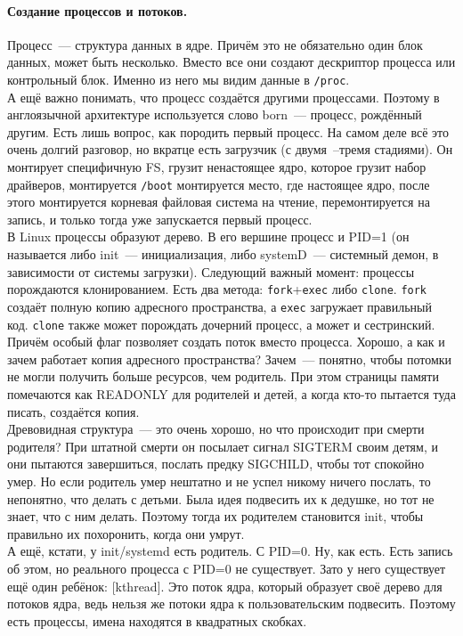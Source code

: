 \documentclass{article}
\begin{document}
    \paragraph{Создание процессов и потоков.}
    Процесс~--- структура данных в ядре. Причём это не обязательно один блок данных, может быть несколько. Вместо все они создают дескриптор процесса или контрольный блок. Именно из него мы видим данные в \texttt{/proc}.\\
    А ещё важно понимать, что процесс создаётся другими процессами. Поэтому в англоязычной архитектуре используется слово born~--- процесс, рождённый другим. Есть лишь вопрос, как породить первый процесс. На самом деле всё это очень долгий разговор, но вкратце есть загрузчик (с двумя~--тремя стадиями). Он монтирует специфичную FS, грузит ненастоящее ядро, которое грузит набор драйверов, монтируется \texttt{/boot} монтируется место, где настоящее ядро,  после этого монтируется корневая файловая система на чтение, перемонтируется на запись, и только тогда уже запускается первый процесс.\\
    В Linux процессы образуют дерево. В его вершине процесс и PID=1 (он называется либо init~--- инициализация, либо systemD~--- системный демон, в зависимости от системы загрузки). Следующий важный момент: процессы порождаются клонированием. Есть два метода: \texttt{fork}+\texttt{exec} либо \texttt{clone}. \texttt{fork} создаёт полную копию адресного пространства, а \texttt{exec} загружает правильный код. \texttt{clone} также может порождать дочерний процесс, а может и сестринский. Причём особый флаг позволяет создать поток вместо процесса. Хорошо, а как и зачем работает копия адресного пространства? Зачем~--- понятно, чтобы потомки не могли получить больше ресурсов, чем родитель. При этом страницы памяти помечаются как READONLY для родителей и детей, а когда кто-то пытается туда писать, создаётся копия.\\
    Древовидная структура~--- это очень хорошо, но что происходит при смерти родителя? При штатной смерти он посылает сигнал SIGTERM своим детям, и они пытаются завершиться, послать предку SIGCHILD, чтобы тот спокойно умер. Но если родитель умер нештатно и не успел никому ничего послать, то непонятно, что делать с детьми. Была идея подвесить их к дедушке, но тот не знает, что с ним делать. Поэтому тогда их родителем становится init, чтобы правильно их похоронить, когда они умрут.\\
    А ещё, кстати, у init/systemd есть родитель. С PID=0. Ну, как есть. Есть запись об этом, но реального процесса с PID=0 не существует. Зато у него существует ещё один ребёнок: [kthread]. Это поток ядра, который образует своё дерево для потоков ядра, ведь нельзя же потоки ядра к пользовательским подвесить. Поэтому есть процессы, имена находятся в квадратных скобках.\\
\end{document}

